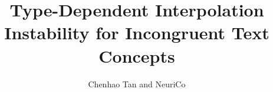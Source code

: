 \documentclass{article}
\title{Type-Dependent Interpolation Instability for Incongruent Text Concepts}
\author{Chenhao Tan and NeuriCo}
\begin{document}
\maketitle

\begin{abstract}

\end{abstract}









\end{document}

